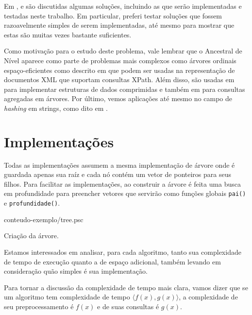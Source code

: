 Em \citet{Bender2002TheLA}, \citet{LAInPractice} e \citet{menghani2019simple} são
discutidas algumas soluções, incluindo as que serão implementadas e testadas neste
trabalho. Em particular, preferi testar soluções que fossem razoavelmente simples
de serem implementadas, até mesmo para mostrar que estas são muitas vezes bastante
suficientes.

Como motivação para o estudo deste problema, vale lembrar que o Ancestral de Nível
aparece como parte de problemas mais complexos como árvores ordinais espaço-eficientes
como descrito em \citet{Geary:2006:SOT:1198513.1198516} que podem ser usadas na
representação de documentos XML que suportam consultas XPath. Além disso, são usadas
em \citet{Sadakane:2006:SSD:1109557.1109693} para implementar estruturas de dados
comprimidas e também em \citet{Yuan:2009:EDS:1514894.1514908} para consultas agregadas
em árvores. Por último, vemos aplicações até mesmo no campo de \textit{hashing} em
strings, como dito em \citet{10.1007/3-540-61258-0_11}.

\section{Implementações}

Todas as implementações assumem a mesma implementação de árvore onde é
guardada apenas sua raíz e cada nó contém um vetor de ponteiros para seus
filhos. Para facilitar as implementações, ao construir a árvore é feita uma
busca em profundidade para preencher vetores que servirão como funções globais
\texttt{pai()} e \texttt{profundidade()}.

\begin{program}[H]
  
  {conteudo-exemplo/tree.psc}

  \caption{Criação da árvore.\label{prog:tree}}
\end{program}

Estamos interessados em analisar, para cada algoritmo, tanto sua complexidade de
tempo de execução quanto a de espaço adicional, também levando em consideração quão
simples é sua implementação.

Para tornar a discussão da complexidade de tempo mais clara, vamos dizer que se um
algoritmo tem complexidade de tempo $\langle f(x), g(x) \rangle$, a complexidade de
seu preprocessamento é $f(x)$ e de suas consultas é $g(x)$.

